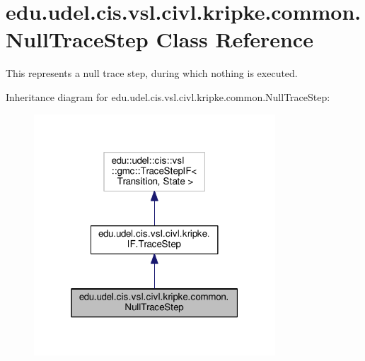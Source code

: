 \hypertarget{classedu_1_1udel_1_1cis_1_1vsl_1_1civl_1_1kripke_1_1common_1_1NullTraceStep}{}\section{edu.\+udel.\+cis.\+vsl.\+civl.\+kripke.\+common.\+Null\+Trace\+Step Class Reference}
\label{classedu_1_1udel_1_1cis_1_1vsl_1_1civl_1_1kripke_1_1common_1_1NullTraceStep}


This represents a null trace step, during which nothing is executed.  




Inheritance diagram for edu.\+udel.\+cis.\+vsl.\+civl.\+kripke.\+common.\+Null\+Trace\+Step\+:
\nopagebreak
\begin{figure}[H]
\begin{center}
\leavevmode
\includegraphics[width=256pt]{classedu_1_1udel_1_1cis_1_1vsl_1_1civl_1_1kripke_1_1common_1_1NullTraceStep__inherit__graph}
\end{center}
\end{figure}


